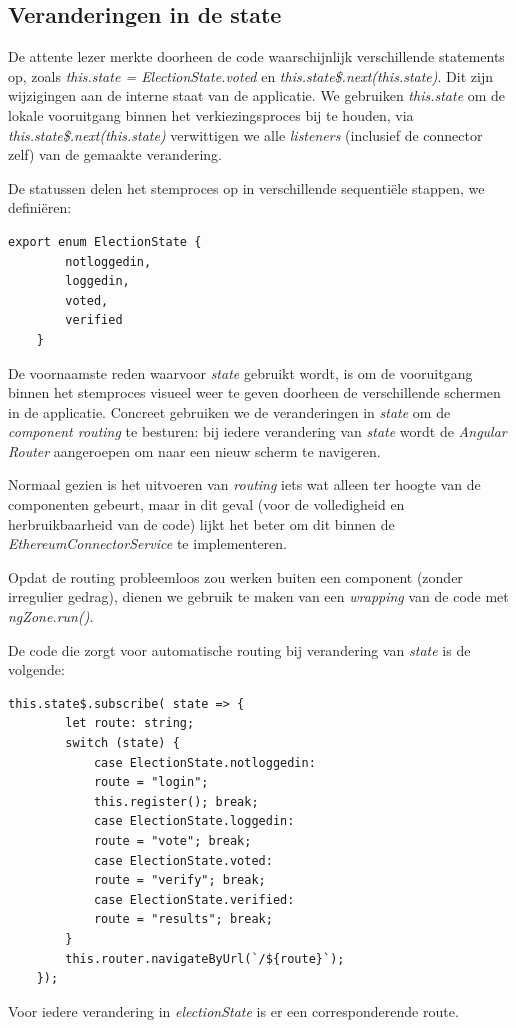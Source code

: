 	\subsection{Veranderingen in de state}
	De attente lezer merkte  doorheen de code waarschijnlijk verschillende statements op, zoals \textit{this.state = ElectionState.voted} en \textit{this.state\$.next(this.state)}. Dit zijn wijzigingen aan de interne staat van de applicatie. We gebruiken \textit{this.state} om de lokale vooruitgang binnen het verkiezingsproces bij te houden, via \textit{this.state\$.next(this.state)} verwittigen we alle \textit{listeners} (inclusief de connector zelf) van de gemaakte verandering.
	
	De statussen delen het stemproces op in verschillende sequentiële stappen, we definiëren:
	\begin{lstlisting}[numbers=none]
	export enum ElectionState {
		notloggedin,
		loggedin,				
		voted, 						
		verified  					 
	}
	\end{lstlisting}
	De voornaamste reden waarvoor \textit{state} gebruikt wordt, is om de vooruitgang binnen het stemproces visueel weer te geven doorheen de verschillende schermen in de applicatie. Concreet gebruiken we de veranderingen in \textit{state} om de \textit{component routing} te besturen: bij iedere verandering van \textit{state} wordt de \textit{Angular Router} aangeroepen om naar een nieuw scherm te navigeren.
	
	Normaal gezien is het uitvoeren van \textit{routing} iets wat alleen ter hoogte van de componenten gebeurt, maar in dit geval (voor de volledigheid en herbruikbaarheid van de code) lijkt het beter om dit binnen de \textit{EthereumConnectorService} te implementeren. 
	
	Opdat de routing probleemloos zou werken buiten een component (zonder irregulier gedrag), dienen we gebruik te maken van een \textit{wrapping} van de code met \textit{ngZone.run()}.
	
	De code die zorgt voor automatische routing bij verandering van \textit{state} is de volgende:
	\begin{lstlisting}[numbers=none]
	this.state$.subscribe( state => {
		let route: string;
		switch (state) {
			case ElectionState.notloggedin:
			route = "login";
			this.register(); break;
			case ElectionState.loggedin:
			route = "vote"; break;
			case ElectionState.voted:
			route = "verify"; break;
			case ElectionState.verified:
			route = "results"; break;
		}
		this.router.navigateByUrl(`/${route}`);
	});
	\end{lstlisting}
	Voor iedere verandering in \textit{electionState} is er een corresponderende route.
	
